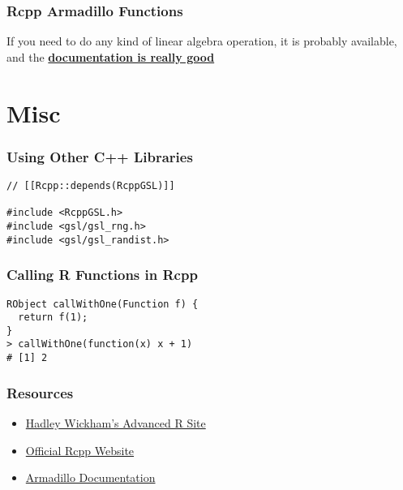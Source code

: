 \documentclass[10pt, compress]{beamer}
\begin{document}
\begin{frame}
  \frametitle{Rcpp Armadillo Functions}
  If you need to do any kind of linear algebra operation, it is probably available, and the \textbf{\href{http://arma.sourceforge.net/docs.html}{documentation is really good}}
\end{frame}


\section{Misc}
\begin{frame}[fragile]
  \frametitle{Using Other C++ Libraries}
  \begin{Verbatim}
// [[Rcpp::depends(RcppGSL)]]

#include <RcppGSL.h>
#include <gsl/gsl_rng.h>
#include <gsl/gsl_randist.h>
  \end{Verbatim}
\end{frame}

\begin{frame}[fragile]
  \frametitle{Calling R Functions in Rcpp}
\begin{Verbatim}[fontsize=\small]
RObject callWithOne(Function f) {
  return f(1);
}
> callWithOne(function(x) x + 1)
# [1] 2
\end{Verbatim}

\end{frame}

\begin{frame}
  \frametitle{Resources}
  \begin{itemize}
    \item \href{http://adv-r.had.co.nz/Rcpp.html}{Hadley Wickham's Advanced R Site}
    \item \href{http://www.rcpp.org/}{Official Rcpp Website}
    \item \href{http://arma.sourceforge.net/docs.html}{Armadillo Documentation}
  \end{itemize}
\end{frame}
\end{document}
